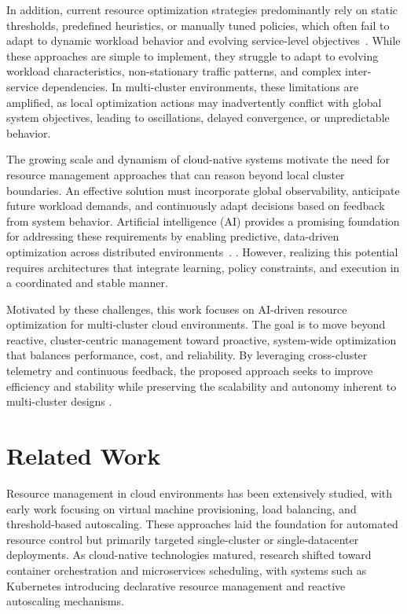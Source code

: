 \documentclass[conference]{IEEEtran}
\begin{document}
In addition, current resource optimization strategies predominantly rely on static thresholds, predefined heuristics, or manually tuned policies, which often fail to adapt to dynamic workload behavior and evolving service-level objectives~\cite{rajammal2025dynamic,Vinoth_IJCST}. While these approaches are simple to implement, they struggle to adapt to evolving workload characteristics, non-stationary traffic patterns, and complex inter-service dependencies. In multi-cluster environments, these limitations are amplified, as local optimization actions may inadvertently conflict with global system objectives, leading to oscillations, delayed convergence, or unpredictable behavior.

The growing scale and dynamism of cloud-native systems motivate the need for resource management approaches that can reason beyond local cluster boundaries. An effective solution must incorporate global observability, anticipate future workload demands, and continuously adapt decisions based on feedback from system behavior. Artificial intelligence (AI) provides a promising foundation for addressing these requirements by enabling predictive, data-driven optimization across distributed environments~\cite{chen2021aiops, punniyamoorthy2025privacy}.
. However, realizing this potential requires architectures that integrate learning, policy constraints, and execution in a coordinated and stable manner.

Motivated by these challenges, this work focuses on AI-driven resource optimization for multi-cluster cloud environments. The goal is to move beyond reactive, cluster-centric management toward proactive, system-wide optimization that balances performance, cost, and reliability. By leveraging cross-cluster telemetry and continuous feedback, the proposed approach seeks to improve efficiency and stability while preserving the scalability and autonomy inherent to multi-cluster designs \cite{dumitru2024crosscluster}.

\section{Related Work}

Resource management in cloud environments has been extensively studied, with early work focusing on virtual machine provisioning, load balancing, and threshold-based autoscaling. These approaches laid the foundation for automated resource control but primarily targeted single-cluster or single-datacenter deployments. As cloud-native technologies matured, research shifted toward container orchestration and microservices scheduling, with systems such as Kubernetes introducing declarative resource management and reactive autoscaling mechanisms.
\end{document}
